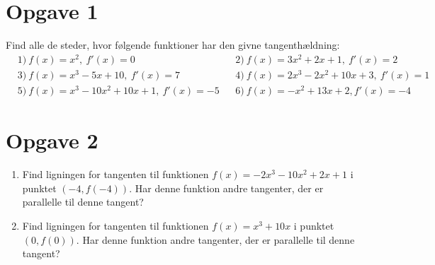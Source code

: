 \section*{Opgave 1}
Find alle de steder, hvor følgende funktioner har den givne tangenthældning:
\begin{align*}
&1) \ f(x) = x^2,\  f'(x) = 0     &&2) \ f(x) = 3x^2 + 2x + 1,\  f'(x) = 2    \\
&3) \ f(x) = x^3-5x+10, \ f'(x) = 7    &&4) \ f(x) = 2x^3 -2x^2+10x+3, \ f'(x) = 1     \\
&5) \  f(x) = x^3-10x^2+10x+1,\ f'(x) = -5   &&6) \ f(x) = -x^2+13x+2, f'(x) = -4    
\end{align*}
\section*{Opgave 2}
\begin{enumerate}[label = \roman*)]
\item Find ligningen for tangenten til funktionen $f(x)=-2 x^3-10x^2+2x+1$ i punktet $(-4,f(-4))$. Har denne funktion andre tangenter, der er parallelle til denne tangent?
\item Find ligningen for tangenten til funktionen $f(x) = x^3 + 10x$ i punktet $(0,f(0))$. Har denne funktion andre tangenter, der er parallelle til denne tangent?
\end{enumerate}
